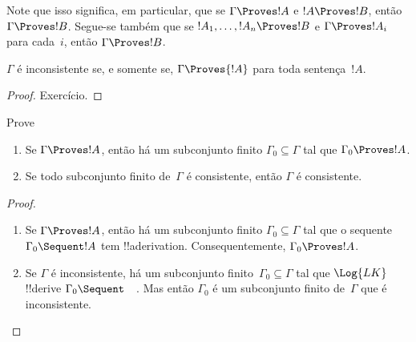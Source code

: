 \documentclass[../../../include/open-logic-section]{subfiles}
\begin{document}
Note que isso significa, em particular, que se $\Gamma \Proves !A$ e $!A
\Proves !B$, então $\Gamma \Proves !B$. Segue-se também que se $!A_1,
\dots, !A_n \Proves !B$ e $\Gamma \Proves !A_i$ para cada~$i$, então
$\Gamma \Proves !B$.

\begin{prop}
$\Gamma$ é inconsistente se, e somente se, $\Gamma \Proves {!A}$ para toda
  sentença~$!A$.
\end{prop}

\begin{proof}
Exercício.
\end{proof}

\begin{prob}
Prove 
\end{prob}

\begin{prop}[Compacidade]
  \begin{enumerate}
  \item Se $\Gamma \Proves !A$, então há um subconjunto finito $\Gamma_0
    \subseteq \Gamma$ tal que $\Gamma_0 \Proves !A$.
  \item Se todo subconjunto finito de~$\Gamma$ é
    consistente, então $\Gamma$ é consistente.
  \end{enumerate}
\end{prop}

\begin{proof}
  \begin{enumerate}
    \item Se $\Gamma \Proves !A$, então há um subconjunto finito
      $\Gamma_0 \subseteq \Gamma$ tal que o sequente $\Gamma_0
      \Sequent !A$ tem !!a{derivation}. Consequentemente, $\Gamma_0
      \Proves !A$.
    \item Se $\Gamma$ é inconsistente, há um subconjunto
      finito~$\Gamma_0 \subseteq \Gamma$ tal que $\Log{LK}$
      !!{derive} $\Gamma_0 \Sequent \quad$. Mas então $\Gamma_0$ é um
      subconjunto finito de~$\Gamma$ que é inconsistente.
  \end{enumerate}
\end{proof}
\end{document}
